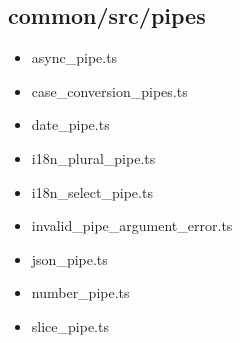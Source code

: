 \subsection{common/src/pipes}


\begin{itemize}
  \item async\_pipe.ts
  \item case\_conversion\_pipes.ts
  \item date\_pipe.ts
  \item i18n\_plural\_pipe.ts
  \item i18n\_select\_pipe.ts
  \item invalid\_pipe\_argument\_error.ts
  \item json\_pipe.ts
  \item number\_pipe.ts
  \item slice\_pipe.ts
\end{itemize}










